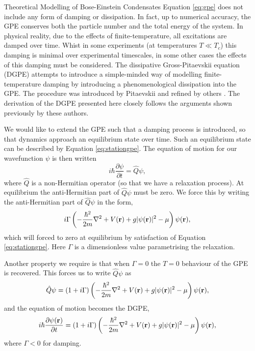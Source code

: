 \begin{chapter}{\label{cha:theoretical_model}Theoretical Modelling of Bose-Einstein Condensates}
	Equation \ref{eq:gpe} does not include any form of damping or dissipation. In fact, up to numerical accuracy, the GPE conserves both the particle number and the total energy of the system. In physical reality, due to the effects of finite-temperature, all excitations are damped over time. Whist in some experiments (at temperatures $T\ll T_c$) this damping is minimal over experimental timescales, in some other cases the effects of this damping must be considered. The dissipative Gross-Pitaevskii equation (DGPE) attempts to introduce a simple-minded way of modelling finite-temperature damping by introducing a phenomenological dissipation into the GPE. The procedure was introduced by Pitaevskii \cite{lifshitzpitaevskii81} and refined by others \cite{choi_morgan_98,tsubota_kasamatsu_02,madarassy_barenghi_08}. The derivation of the DGPE presented here closely follows the arguments shown previously by these authors.

	We would like to extend the GPE such that a damping process is introduced, so that dynamics approach an equilibrium state over time. Such an equilibrium state can be described by Equation \ref{eq:stationgpe}. The equation of motion for our wavefunction $\psi$ is then written 
		\begin{equation}\label{eq:disseqmotion}
		i\hbar \frac{\partial \psi}{\partial t} = \hat{Q}\psi,
		\end{equation}
	where $\hat{Q}$ is a non-Hermitian operator (so that we have a relaxation process). At equilibrium the anti-Hermitian part of $\hat{Q}\psi$ must be zero. We force this by writing the anti-Hermitian part of $\hat{Q}\psi$ in the form,
	\begin{equation*}\label{eq:dissantiherm}
		i\Gamma\left( -\frac{\hbar^2}{2m}\nabla^2 + V({\bf r}) + g|\psi({\bf r})|^2 - \mu \right) \psi({\bf r}),
	\end{equation*}
	which will forced to zero at equilibrium by satisfaction of Equation \ref{eq:stationgpe}. Here $\Gamma$ is a dimensionless value parametrising the relaxation.

	Another property we require is that when $\Gamma=0$ the $T=0$ behaviour of the GPE is recovered. This forces us to write $\hat{Q}\psi$ as
	\begin{equation*}\label{eq:dissantiherm2}
		\hat{Q}\psi = (1+i\Gamma)\left( -\frac{\hbar^2}{2m}\nabla^2 + V({\bf r}) + g|\psi({\bf r})|^2 - \mu \right) \psi({\bf r}),
	\end{equation*}
	and the equation of motion becomes the DGPE,
	\begin{equation}\label{eq:dissgpeA}
		i\hbar \frac{\partial \psi({\bf r})}{\partial t} = (1+i\Gamma)\left( -\frac{\hbar^2 }{2m}\nabla^2 + V({\bf r}) + g|\psi({\bf r})|^2- \mu \right) \psi({\bf r}),
	\end{equation}
	where $\Gamma<0$ for damping.


\end{chapter}

